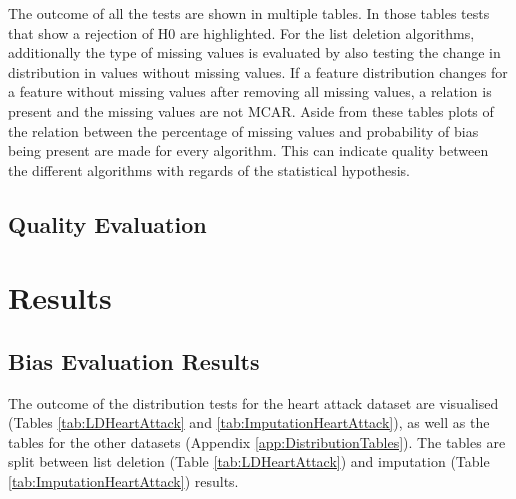 \documentclass[10pt,a4paper]{article}
\begin{document}
	The outcome of all the tests are shown in multiple tables. In those tables tests that show a rejection of H0 are highlighted. For the list deletion algorithms, additionally the type of missing values is evaluated by also testing the change in distribution in values without missing values. If a feature distribution changes for a feature without missing values after removing all missing values, a relation is present and the missing values are not MCAR. Aside from these tables plots of the relation between the percentage of missing values and probability of bias being present are made for every algorithm. This can indicate quality between the different algorithms with regards of the statistical hypothesis.

	\subsection{Quality Evaluation}
	\label{subsec:QualityEvaluation}
	
	\section{Results}
	\label{sec:Results}
	
	\subsection{Bias Evaluation Results}
	\label{subsec:BiasEvaluationResults}
	
	The outcome of the distribution tests for the heart attack dataset are visualised (Tables \ref{tab:LDHeartAttack} and \ref{tab:ImputationHeartAttack}), as well as the tables for the other datasets (Appendix \ref{app:DistributionTables}). The tables are split between list deletion (Table \ref{tab:LDHeartAttack}) and imputation (Table \ref{tab:ImputationHeartAttack}) results.
	
\end{document}
